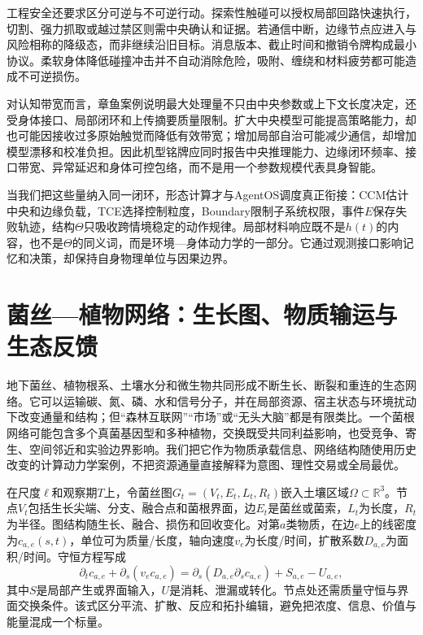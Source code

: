 工程安全还要求区分可逆与不可逆行动。探索性触碰可以授权局部回路快速执行，切割、强力抓取或越过禁区则需中央确认和证据。若通信中断，边缘节点应进入与风险相称的降级态，而非继续沿旧目标。消息版本、截止时间和撤销令牌构成最小协议。柔软身体降低碰撞冲击并不自动消除危险，吸附、缠绕和材料疲劳都可能造成不可逆损伤。

对认知带宽而言，章鱼案例说明最大处理量不只由中央参数或上下文长度决定，还受身体接口、局部闭环和上传摘要质量限制。扩大中央模型可能提高策略能力，却也可能因接收过多原始触觉而降低有效带宽；增加局部自治可能减少通信，却增加模型漂移和校准负担。因此机型铭牌应同时报告中央推理能力、边缘闭环频率、接口带宽、异常延迟和身体可控包络，而不是用一个参数规模代表具身智能。

当我们把这些量纳入同一闭环，形态计算才与AgentOS调度真正衔接：CCM估计中央和边缘负载，TCE选择控制粒度，Boundary限制子系统权限，事件$E$保存失败轨迹，结构$\Theta$只吸收跨情境稳定的动作规律。局部材料响应既不是$h(t)$的内容，也不是$\Theta$的同义词，而是环境—身体动力学的一部分。它通过观测接口影响记忆和决策，却保持自身物理单位与因果边界。

\section{菌丝—植物网络：生长图、物质输运与生态反馈}
\label{sec:section_4579}

地下菌丝、植物根系、土壤水分和微生物共同形成不断生长、断裂和重连的生态网络。它可以运输碳、氮、磷、水和信号分子，并在局部资源、宿主状态与环境扰动下改变通量和结构；但“森林互联网”“市场”或“无头大脑”都是有限类比。一个菌根网络可能包含多个真菌基因型和多种植物，交换既受共同利益影响，也受竞争、寄生、空间邻近和实验边界影响。我们把它作为物质承载信息、网络结构随使用历史改变的计算动力学案例，不把资源通量直接解释为意图、理性交易或全局最优。

在尺度$\ell$和观察期$T$上，令菌丝图$G_t=(V_t,E_t,L_t,R_t)$嵌入土壤区域$\Omega\subset\mathbb R^3$。节点$V_t$包括生长尖端、分支、融合点和菌根界面，边$E_t$是菌丝或菌索，$L_t$为长度，$R_t$为半径。图结构随生长、融合、损伤和回收变化。对第$a$类物质，在边$e$上的线密度为$c_{a,e}(s,t)$，单位可为质量/长度，轴向速度$v_e$为长度/时间，扩散系数$D_{a,e}$为面积/时间。守恒方程写成
\begin{equation}
 \partial_t c_{a,e}+\partial_s(v_e c_{a,e})
 =\partial_s(D_{a,e}\partial_s c_{a,e})+S_{a,e}-U_{a,e},
\end{equation}
其中$S$是局部产生或界面输入，$U$是消耗、泄漏或转化。节点处还需质量守恒与界面交换条件。该式区分平流、扩散、反应和拓扑编辑，避免把浓度、信息、价值与能量混成一个标量。

